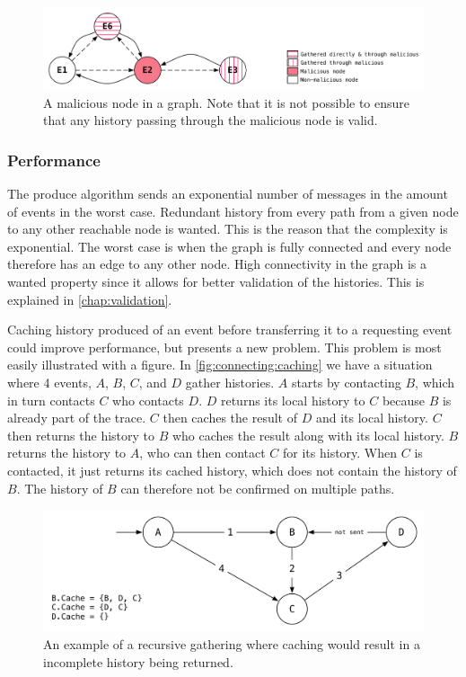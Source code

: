 	\begin{figure}[H]
		\centering
		\includegraphics[width=\textwidth]{4connect/images/recursive-evil-node.pdf}
		\caption{A malicious node in a graph. Note that it is not possible to ensure that any history passing through the malicious node is valid.}
		\label{fig:connecting:recursive-evil-node}
	\end{figure}
	
	\subsubsection{Performance}
	The produce algorithm sends an exponential number of messages in the amount of events in the worst case. Redundant history from every path from a given node to any other reachable node is wanted. This is the reason that the complexity is exponential. The worst case is when the graph is fully connected and every node therefore has an edge to any other node. High connectivity in the graph is a wanted property since it allows for better validation of the histories. This is explained in \autoref{chap:validation}.
	
	\newpar Caching history produced of an event before transferring it to a requesting event could improve performance, but presents a new problem. This problem is most easily illustrated with a figure. In \autoref{fig:connecting:caching} we have a situation where 4 events, $A$, $B$, $C$, and $D$ gather histories. $A$ starts by contacting $B$, which in turn contacts $C$ who contacts $D$. $D$ returns its local history to $C$ because $B$ is already part of the trace. $C$ then caches the result of $D$ and its local history. $C$ then returns the history to $B$ who caches the result along with its local history. $B$ returns the history to $A$, who can then contact $C$ for its history. When $C$ is contacted, it just returns its cached history, which does not contain the history of $B$. The history of $B$ can therefore not be confirmed on multiple paths.
	
	\begin{figure}[H]
		\centering
		\includegraphics[height=0.20\textheight]{4connect/images/caching.pdf}
		\caption{An example of a recursive gathering where caching would result in a incomplete history being returned.}
		\label{fig:connecting:caching}
	\end{figure}
	
